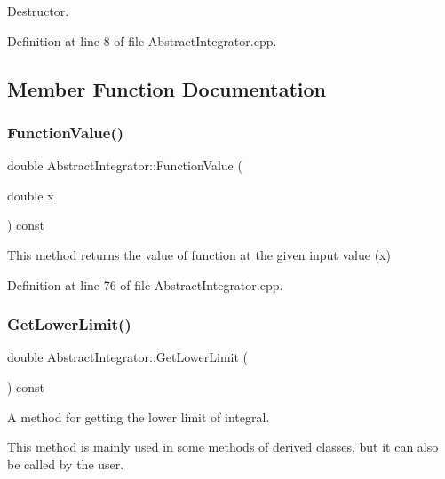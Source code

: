 Destructor. 



Definition at line 8 of file Abstract\+Integrator.\+cpp.



\subsection{Member Function Documentation}
\mbox{\label{class_abstract_integrator_a6262731b81f3ad7e984ba354b4601356}} 
\subsubsection{\texorpdfstring{Function\+Value()}{FunctionValue()}}
{\footnotesize\ttfamily double Abstract\+Integrator\+::\+Function\+Value (\begin{DoxyParamCaption}\item[{double}]{x }\end{DoxyParamCaption}) const}



This method returns the value of function at the given input value (x) 



Definition at line 76 of file Abstract\+Integrator.\+cpp.

\mbox{\label{class_abstract_integrator_ae27a09d1e3fb0a30ce9545a4d8f29cad}} 
\subsubsection{\texorpdfstring{Get\+Lower\+Limit()}{GetLowerLimit()}}
{\footnotesize\ttfamily double Abstract\+Integrator\+::\+Get\+Lower\+Limit (\begin{DoxyParamCaption}{ }\end{DoxyParamCaption}) const}



A method for getting the lower limit of integral. 

This method is mainly used in some methods of derived classes, but it can also be called by the user. 

